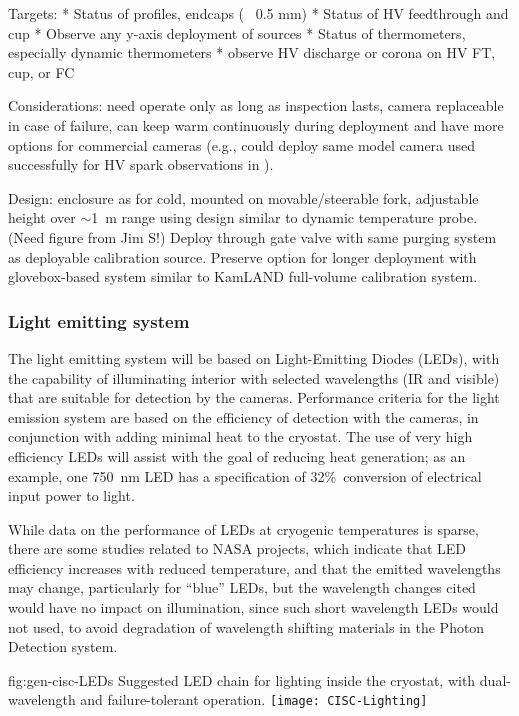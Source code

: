 Targets: * Status of profiles, endcaps (~ 0.5 mm)
* Status of HV feedthrough and cup
* Observe any y-axis deployment of sources
* Status of thermometers, especially dynamic thermometers
* observe HV discharge or corona on HV FT, cup, or FC

Considerations: need operate only as long as inspection lasts, camera
replaceable in case of failure, can keep warm continuously during
deployment and have more options for commercial cameras (e.g., could
deploy same model camera used successfully for HV spark observations
in \cite{Auger:2015xlo}).

Design: enclosure as for cold, mounted on movable/steerable fork, adjustable
height over $\sim$\SI{1}{m} range using design similar to dynamic temperature probe.
(Need figure from Jim S!)
Deploy through
gate valve with same purging system as deployable calibration source.
Preserve option for longer deployment with glovebox-based system similar
to KamLAND full-volume calibration system.

\subsubsection{Light emitting system}
The light emitting system will be based on Light-Emitting Diodes
(LEDs), with the capability of illuminating interior with selected
wavelengths (IR and visible) that are suitable for detection by the
cameras.  Performance criteria for the light emission system are based
on the efficiency of detection with the cameras, in conjunction with
adding minimal heat to the cryostat. The use of very high efficiency
LEDs will assist with the goal of reducing heat generation; as an
example, one \SI{750}{nm} LED has a specification of
32\%\ conversion of electrical input power to light.

While data on the performance of LEDs at cryogenic temperatures is sparse,
there are some studies related to NASA projects\cite{Carron:2017zzz}, which
indicate that LED efficiency increases with reduced temperature,
and that the emitted wavelengths may change, particularly for ``blue'' LEDs,
but the wavelength changes cited would have no impact on illumination, since
such short wavelength LEDs would not used, to avoid degradation of wavelength
shifting materials in the Photon Detection system.

\begin{dunefigure}{fig:gen-cisc-LEDs}
  {Suggested LED chain for lighting inside the cryostat, with
    dual-wavelength and failure-tolerant operation.}
\texttt{[image: CISC-Lighting]}
\end{dunefigure}

